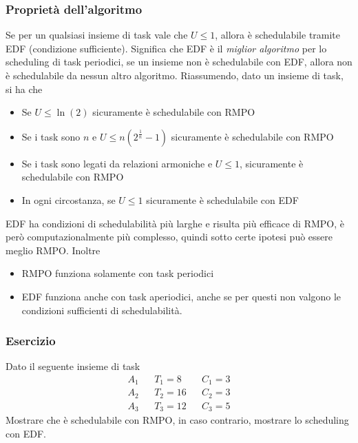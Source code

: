\documentclass[10pt, letterpaper]{report}
\begin{document}
\subsubsection{Proprietà dell'algoritmo}
\prop{} Se per un qualsiasi insieme di task vale che $U\le 1$, allora 
è schedulabile tramite EDF (condizione sufficiente). Significa che 
EDF è il \textit{miglior algoritmo} per lo scheduling di task periodici, 
se un insieme non è schedulabile con EDF, allora non è 
schedulabile da nessun altro algoritmo.\acc 
Riassumendo, dato un insieme di task, si ha che
\begin{itemize}
    \item Se $U\le \ln(2)$ sicuramente è schedulabile con RMPO 
    \item Se i task sono $n$ e $U\le n(2^{\frac{1}{n}}-1)$ sicuramente è schedulabile con RMPO 
    \item Se i task sono legati da relazioni armoniche e 
    $U\le 1$, sicuramente è schedulabile con RMPO 
    \item In ogni circostanza, se $U\le 1$ sicuramente è schedulabile con EDF 
\end{itemize}
EDF ha condizioni di schedulabilità più larghe e risulta 
più efficace di RMPO, è però computazionalmente più complesso, quindi 
sotto certe ipotesi può essere meglio RMPO. Inoltre\begin{itemize}
    \item RMPO funziona solamente con task periodici 
    \item EDF funziona anche con task aperiodici, anche se 
    per questi non valgono le condizioni sufficienti di schedulabilità.
\end{itemize}
\subsubsection{Esercizio}
Dato il seguente insieme di task 
$$ \begin{matrix}
    A_1&&T_1=8&&C_1=3\\ 
    A_2&&T_2=16&&C_2=3\\ 
    A_3&&T_3=12&&C_3=5
\end{matrix} $$
Mostrare che è schedulabile con RMPO, in caso contrario, 
mostrare lo scheduling con EDF. 
\end{document}
